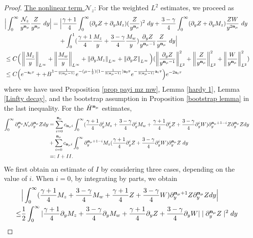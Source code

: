 \documentclass{article}
\newcommand{\norm}[1]{\left\lVert#1\right\rVert}
\newcommand{\ga}{\gamma}
\newcommand{\pa}{\partial}
\def\espz{Z}
\def\espw{W}
\def\mz{M_z}
\def\mw{M_w}
\def\nz{\mathcal N_z}
\def\epone{\mathtt{a_1}}
\def\eptwo{\mathtt{a_2}}
\def\epzero{\mathtt{a_0}}
\def\ndmu{{\bf{n}_{\mu}}}
\numberwithin{equation}{section}
\begin{document}
\begin{proof}
	\noindent\underline{The nonlinear term $\nz$}: 
    For the weighted $L^2$ estimates, we proceed as 
    \begin{align*}
      & \Big| \int_0^\infty \frac{\nz}{y^{\ndmu}} \frac{\espz}{y^{\ndmu}} \ dy \Big| = \Big|\frac{\ga+1}{4}\int_0^\infty(\pa_y\espz+\pa_y\mz) (\frac{\espz}{y^{\ndmu}})^2 \ dy +\frac{3-\ga}{4}\int_0^\infty (\pa_y \espz+\pa_y \mz)\frac{\espz \espw}{y^{2\ndmu}} \ dy\\
        &\qquad\qquad\qquad\qquad\quad + \int_0^1(\frac{\ga+1}{4}\frac{\mz}{y} +\frac{3-\ga}{4}\frac{\mw}{y} ) \frac{\pa_y \espz}{y^{\ndmu-1}}\frac{ \espz}{y^{\ndmu}} \ dy\Big| \\
       & \leq C\Big( \norm{\frac{\mz}{y}}_{L^\infty}+\norm{\frac{\mw}{y}}_{L^\infty}+\norm{\pa_y\mz}_{L^\infty}+\norm{\pa_y\espz}_{L^\infty}\Big) (\norm{\frac{\pa_y \espz}{y^{\ndmu-1}}}_{L^2}^2+\norm{\frac{\espz}{y^{\ndmu}}}_{L^2}^2+\norm{\frac{\espw}{y^{\ndmu}}}_{L^2}^2)\\
       &\leq C\Big(e^{-\epzero \tau}++B^{1-\frac{1}{2(\ndmu-1)}}e^{-(\mu-\frac12)(1-\frac{1}{2(\ndmu-1)})\eptwo\tau} e^{-\frac{1}{2(\ndmu-1)}\epone \tau}\Big) e^{-2\epone \tau}
    \end{align*}
    where we have used Proposition \ref{prop payi mz mw}, Lemma \ref{hardy 1}, Lemma \ref{Linfty decay}, and the bootstrap assumption in Proposition \ref{bootstrap lemma} in the last inequality.
    For the $\dot H^{\ndmu}$ estimates,
	\begin{align*}
	    \int_0^\infty \pa_y^{\ndmu}\nz \pa_y^{\ndmu} \espz dy&= \sum_{i=0}^{\ndmu} c_{\ndmu i} \int_0^\infty (\frac{\ga+1}{4}\pa_y^i\mz+\frac{3-\ga}{4}\pa_y^i\mw+\frac{\ga+1}{4}\pa_y^i\espz+\frac{3-\ga}{4}\pa_y^i\espw)\partial_y^{\ndmu+1-i}\espz\pa_y^{\ndmu} \espz dy\\
        &+\sum_{i=0}^{\ndmu} c_{\ndmu i} \int_0^\infty \pa_y^{\ndmu+1-i}\mz(\frac{\ga+1}{4}\pa_y^i\espz +\frac{3-\ga}{4}\pa_y^i\espw)\pa_y^{\ndmu}\espz \ dy\\
        &=: I+II.
	\end{align*}
	We first obtain an estimate of $I$ by considering three cases, depending on the value of $i$. 
	When $i=0$, by integrating by parts, we obtain
	\begin{align*}
		 &\Big|\int_0^\infty (\frac{\ga+1}{4}\mz+\frac{3-\ga}{4}\mw+\frac{\ga+1}{4}\espz+\frac{3-\ga}{4}\espw)\partial_y^{\ndmu+1}\espz\pa_y^\ndmu \espz dy\Big| \\
		 \leq&\frac12 \int_0^\infty |\frac{\ga+1}{4}\pa_y\mz+\frac{3-\ga}{4}\pa_y\mw+\frac{\ga+1}{4}\pa_y\espz+\frac{3-\ga}{4}\pa_y\espw|\mid\pa_y^\ndmu \espz\mid^2 dy \\

\end{align*}
\end{proof}
\end{document}
